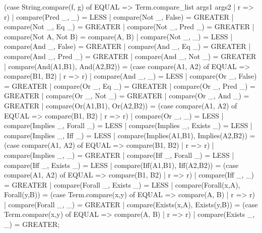       (case String.compare(f, g) of
        EQUAL => Term.compare_list args1 args2
        | r => r)
  | compare(Pred _, _) = LESS
  | compare(Not _, False) = GREATER
  | compare(Not _, Eq _) = GREATER
  | compare(Not _, Pred _) = GREATER
  | compare(Not A, Not B) = compare(A, B)
  | compare(Not _, _) = LESS
  | compare(And _, False) = GREATER
  | compare(And _, Eq _) = GREATER
  | compare(And _, Pred _) = GREATER
  | compare(And _, Not _) = GREATER
  | compare(And(A1,B1), And(A2,B2)) =
     (case compare(A1, A2) of
       EQUAL => compare(B1, B2)
     | r => r)
  | compare(And _, _) = LESS
  | compare(Or _, False) = GREATER
  | compare(Or _, Eq _) = GREATER
  | compare(Or _, Pred _) = GREATER
  | compare(Or _, Not _) = GREATER
  | compare(Or _, And _) = GREATER
  | compare(Or(A1,B1), Or(A2,B2)) =
     (case compare(A1, A2) of
       EQUAL => compare(B1, B2)
     | r => r)
  | compare(Or _, _) = LESS
  | compare(Implies _, Forall _) = LESS
  | compare(Implies _, Exists _) = LESS
  | compare(Implies _, Iff _) = LESS
  | compare(Implies(A1,B1), Implies(A2,B2)) =
     (case compare(A1, A2) of
       EQUAL => compare(B1, B2)
     | r => r)
  | compare(Implies _, _) = GREATER
  | compare(Iff _, Forall _) = LESS
  | compare(Iff _, Exists _) = LESS
  | compare(Iff(A1,B1), Iff(A2,B2)) =
     (case compare(A1, A2) of
       EQUAL => compare(B1, B2)
     | r => r)
  | compare(Iff _, _) = GREATER
  | compare(Forall _, Exists _) = LESS
  | compare(Forall(x,A), Forall(y,B)) =
     (case Term.compare(x,y) of
       EQUAL => compare(A, B)
     | r => r)
  | compare(Forall _, _) = GREATER
  | compare(Exists(x,A), Exists(y,B)) =
     (case Term.compare(x,y) of
       EQUAL => compare(A, B)
     | r => r)
  | compare(Exists _, _) = GREATER;
\eatline

\nwendcode{}

